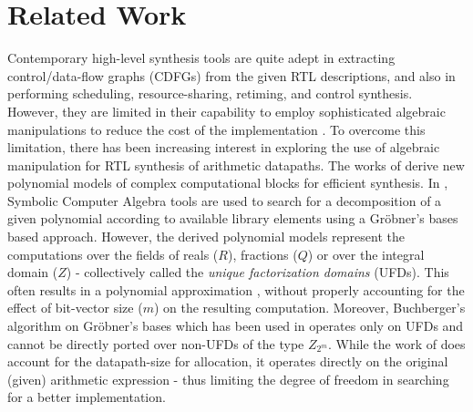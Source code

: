 \vspace{-0.05in}
\section{Related Work}\label{sec:prev}
\vspace{-0.05in}

Contemporary high-level synthesis tools are quite adept in extracting
control/data-flow graphs (CDFGs) from the given RTL descriptions, and
also in performing scheduling, resource-sharing, retiming, and control
synthesis.  However, they are limited in their capability to employ
sophisticated algebraic manipulations to reduce the cost of the
implementation \cite{demicheli:tcad_03}. To overcome this limitation, 
there has been increasing interest in exploring the use of
algebraic manipulation for RTL synthesis of arithmetic datapaths. The
works of \cite{demicheli:iccad_98} \cite{demicheli:date_99} derive new
polynomial models of complex computational blocks for efficient
synthesis. In \cite{demicheli:tcad_03}, Symbolic Computer Algebra 
tools are used to search for a decomposition of a given polynomial
according to available library elements using a 
Gr\"{o}bner's bases based
approach. However, the derived polynomial models represent the
computations over the fields of reals ($R$), fractions ($Q$) or over
the integral domain ($Z$) - collectively called the {\it unique
factorization domains} (UFDs). This often results in a polynomial
approximation \cite{demicheli:tvlsi_01}, without properly accounting
for the effect of bit-vector size ($m$) on the resulting
computation. Moreover, Buchberger's algorithm on Gr\"{o}bner's bases
which has been used in \cite{demicheli:tcad_03} operates only on UFDs
and cannot be directly ported over non-UFDs of the type
$Z_{2^m}$. While the work of \cite{multi-word-synth} does account for
the datapath-size for allocation, it operates directly on the original
(given) arithmetic expression - thus limiting the degree of freedom in
searching for a better implementation.




